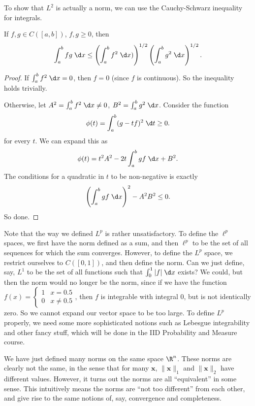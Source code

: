\documentclass[a4paper]{article}
\begin{document}
To show that $L^2$ is actually a norm, we can use the Cauchy-Schwarz inequality for integrals.
\begin{lemma}
  If $f, g\in C([a, b])$, $f, g \geq 0$, then
  \[
    \int_a^b fg\;\d x \leq \left(\int_a^b f^2\;\d x)\right)^{1/2}\left(\int_a^b g^2\;\d x\right)^{1/2}.
  \]
\end{lemma}

\begin{proof}
  If $\int_a^b f^2\;\d x = 0$, then $f = 0$ (since $f$ is continuous). So the inequality holds trivially.

  Otherwise, let $A^2 = \int_a^b f^2\;\d x \not= 0$, $B^2 = \int_a^b g^2\;\d x$. Consider the function
  \[
    \phi(t) = \int_a^b (g - tf)^2 \;\d t \geq 0.
  \]
  for every $t$. We can expand this as
  \[
    \phi(t) = t^2 A^2 - 2t \int_a^b gf\;\d x + B^2.
  \]
  The conditions for a quadratic in $t$ to be non-negative is exactly
  \[
    \left(\int_a^b gf\;\d x\right)^2 - A^2 B^2 \leq 0.
  \]
  So done.
\end{proof}
Note that the way we defined $L^p$ is rather unsatisfactory. To define the $\ell^p$ spaces, we first have the norm defined as a sum, and then $\ell^p$ to be the set of all sequences for which the sum converges. However, to define the $L^p$ space, we restrict ourselves to $C([0, 1])$, and then define the norm. Can we just define, say, $L^1$ to be the set of all functions such that $\int_0^1 |f|\;\d x$ exists? We could, but then the norm would no longer be the norm, since if we have the function $f(x) = \begin{cases} 1 & x = 0.5\\ 0 & x \not= 0.5\end{cases}$, then $f$ is integrable with integral $0$, but is not identically zero. So we cannot expand our vector space to be too large. To define $L^p$ properly, we need some more sophisticated notions such as Lebesgue integrability and other fancy stuff, which will be done in the IID Probability and Measure course.

We have just defined many norms on the same space $\R^n$. These norms are clearly not the same, in the sense that for many $\mathbf{x}$, $\|\mathbf{x}\|_1$ and $\|\mathbf{x}\|_2$ have different values. However, it turns out the norms are all ``equivalent'' in some sense. This intuitively means the norms are ``not too different'' from each other, and give rise to the same notions of, say, convergence and completeness.
\end{document}
